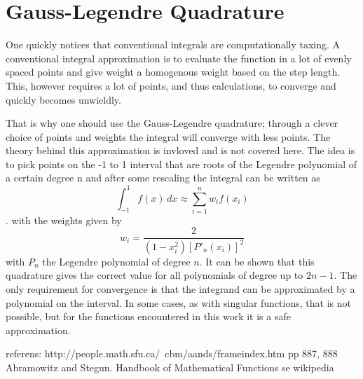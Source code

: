 \documentclass[../main/report.tex]{subfiles}
\begin{document}
\section{Gauss-Legendre Quadrature}
\label{app:gauss-legendre}

One quickly notices that conventional integrals are computationally taxing. 
A conventional integral approximation is to evaluate the function in a lot of evenly spaced points and give weight a homogenous weight based on the step length. 
This, however requires a lot of points, and thus calculations, to converge and quickly becomes unwieldly. 

That is why one should use the Gauss-Legendre quadrature; through a clever choice of points and weights the integral will converge with less points. 
The theory behind this approximation is invloved \cite{Gauss magazine nr 17 millenium edition 1800} and is not covered here. 
The idea is to pick points on the -1 to 1 interval that are roots of the Legendre polynomial of a certain degree n and after some rescaling the integral can be written as
\[
\int_{-1}^1 f(x)\,dx \approx \sum_{i=1}^n w_i f(x_i)
\].
with the weights given by
\[ 
w_i = \frac{2}{\left( 1-x_i^2 \right) [P'_n(x_i)]^2}
\] 
with $P_n$ the Legendre polynomial of degree $n$.
It can be shown that this quadrature gives the correct value for all polynomials of degree up to $2n-1$. 
The only requirement for convergence is that the integrand can be approximated by a polynomial on the interval.
In some cases, as with singular functions, that is not possible, but for the functions encountered in this work it is a safe approximation.



referens: http://people.math.sfu.ca/~cbm/aands/frameindex.htm
pp 887, 888 Abramowitz and Stegun. Handbook of Mathematical Functions 
se wikipedia
\end{document}
